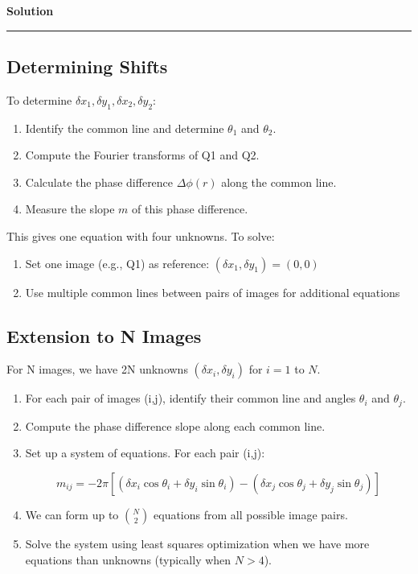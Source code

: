 \documentclass[a4paper,12pt]{article}
\newenvironment{solution}[2][]{%
    \begin{mdframed}[linecolor=blue!70!black, linewidth=2pt, roundcorner=10pt, backgroundcolor=yellow!10!white, skipabove=12pt, skipbelow=12pt]%
        \textbf{\large #2}
        \par\noindent\rule{\textwidth}{0.4pt}
}{
    \end{mdframed}
}
\begin{document}
\begin{solution}{Solution}
\begin{enumerate}
\end{enumerate}


\subsection{Determining Shifts}

To determine $\delta x_1, \delta y_1, \delta x_2, \delta y_2$:
\begin{enumerate}
\item Identify the common line and determine $\theta_1$ and $\theta_2$.
\item Compute the Fourier transforms of Q1 and Q2.
\item Calculate the phase difference $\Delta\phi(r)$ along the common line.
\item Measure the slope $m$ of this phase difference.
\end{enumerate}

\noindent This gives one equation with four unknowns. To solve:
\begin{enumerate}
\item Set one image (e.g., Q1) as reference: $(\delta x_1, \delta y_1) = (0, 0)$
\item Use multiple common lines between pairs of images for additional equations
\end{enumerate}


\subsection{Extension to N Images}

For N images, we have 2N unknowns $(\delta x_i, \delta y_i)$ for $i = 1$ to $N$.
\begin{enumerate}
\item For each pair of images (i,j), identify their common line and angles $\theta_i$ and $\theta_j$.
\item Compute the phase difference slope along each common line.
\item Set up a system of equations. For each pair (i,j):

   \begin{equation}
   m_{ij} = -2\pi[(\delta x_i\cos\theta_i + \delta y_i\sin\theta_i) - (\delta x_j\cos\theta_j + \delta y_j\sin\theta_j)]
   \end{equation}

\item We can form up to $\binom{N}{2}$ equations from all possible image pairs.
\item Solve the system using least squares optimization when we have more equations than unknowns (typically when $N > 4$).
\end{enumerate}

\end{solution}
\end{document}
